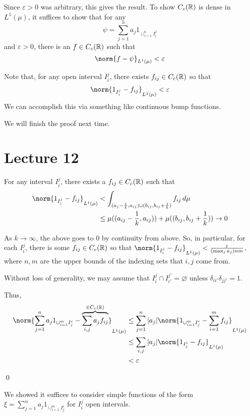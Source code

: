 \documentclass[x11names,reqno,14pt]{extarticle}
\newcommand*{\oo}{\infty}
\begin{document}
Since $\varepsilon>0$ was arbitrary, this gives the result. To show $C_c(\mathbb{R})$ is dense in $L^1(\mu)$, it suffices to show that for any 
\[
\psi = \sum_{j=1}^na_j1_{\cup_{i=1}^n I_i^j}
\]
and $\varepsilon>0$, there is an $f \in C_c(\mathbb{R})$ such that
\[
\norm{f - \psi}_{L^1(\mu)}<\varepsilon
\]

Note that, for any open interval $I_i^j$, there exists $f_{ij}\in C_c(\mathbb{R})$ so that 
\[
\norm{1_{I_i^j} - f_{ij}}_{L^1(\mu)} < \varepsilon
\]
We can accomplish this via something like continuous bump functions. 

We will finish the proof next time. 

\section*{Lecture 12}

For any interval $I_i^j$, there exists a $f_{ij} \in C_c(\mathbb{R})$ such that
\begin{align*}
\norm{1_{I_i^j} - f_{ij}}_{L^1(\mu)} & < \int_{(a_j - \frac{1}{k}, a_{ij}) \cup (b_{ij}, b_{ij} + \frac{1}{k})}f_{ij}\,d\mu \\
						& \leq \mu((a_{ij} - \frac{1}{k}, a_{ij})) + \mu((b_{ij}, b_{ij} + \frac{1}{k})) \to 0
\end{align*}

As $k\to\oo$, the above goes to $0$ by continuity from above. So, in particular, for each $I_i^j$, there is some $f_{ij} \in C_c(\mathbb{R})$ so that $\norm{1_{I_i^j} - f_{ij}}_{L^1(\mu)} < \frac{\varepsilon}{(\max_ja_j)nm}$, where $n, m$ are the upper bounds of the indexing sets that $i, j$ come from. 

Without loss of generality, we may assume that $I_i^j \cap I_{i'}^{j'} = \varnothing$ unless $\delta_{ii'}\delta_{jj'} = 1$. 

Thus, 
\begin{align*}
\norm{\sum_{j=1}^na_j1_{\cup_{i=1}^mI_j^i} - \overbrace{\sum_{i, j}a_jf_{ij}}^{\in C_c(\R)}}_{L^1(\mu)} & \leq \sum_{j=1}^n|a_j|\norm{1_{\cup_{i=1}^mI_j^i} - \sum_{i = 1}^mf_{ij}}_{L^1(\mu)} \\
					& \leq \sum_{i, j}|a_j|\norm{1_{I_j^i} - f_{ij}}_{L^1(\mu)} \\
& < \varepsilon
\end{align*}

\qed

\rem

We showed it suffices to consider simple functions of the form $\xi = \sum_{j=1}^na_j1_{\cup_{i=1}^mI_j^i}$ for $I_i^j$ open intervals. 
\end{document}
